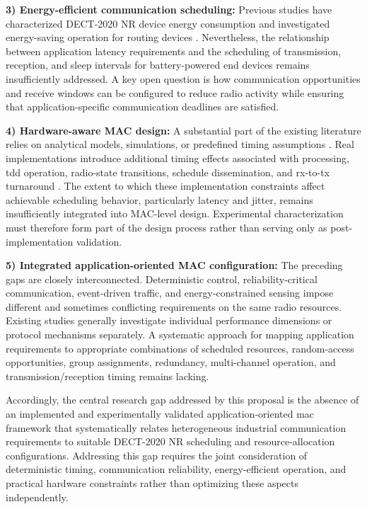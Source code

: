 \documentclass[12pt,a4paper]{article}
\begin{document}
\textbf{3) Energy-efficient communication scheduling:}
Previous studies have characterized DECT-2020 NR device energy consumption and investigated energy-saving operation for routing devices
\cite{nihtilaEnergyConsumptionDECT20202022,
nihtilaEnergySavingRouter2022}.
Nevertheless, the relationship between application latency requirements and the scheduling of transmission, reception, and sleep intervals for battery-powered end devices remains insufficiently addressed. A key open question is how communication opportunities and receive windows can be configured to reduce radio activity while ensuring that application-specific communication deadlines are satisfied.

\textbf{4) Hardware-aware MAC design:}
A substantial part of the existing literature relies on analytical models, simulations, or predefined timing assumptions
\cite{dhanwaniAssessmentCandidateTechnology2020,
anttonenEnablingMassiveMachine2021a,
pennerURLLCPerformanceEvaluation2021}.
Real implementations introduce additional timing effects associated with processing, \gls{tdd} operation, radio-state transitions, schedule dissemination, and \gls{rx}-to-\gls{tx} turnaround
\cite{wassmannPerformanceDECT2020NR2024,
haqueDECT2020NRLink2025,
grafWhatExpectWhen2026}.
The extent to which these implementation constraints affect achievable scheduling behavior, particularly latency and jitter, remains insufficiently integrated into MAC-level design. Experimental characterization must therefore form part of the design process rather than serving only as post-implementation validation.

\textbf{5) Integrated application-oriented MAC configuration:}
The preceding gaps are closely interconnected. Deterministic control, reliability-critical communication, event-driven traffic, and energy-constrained sensing impose different and sometimes conflicting requirements on the same radio resources. Existing studies generally investigate individual performance dimensions or protocol mechanisms separately. A systematic approach for mapping application requirements to appropriate combinations of scheduled resources, random-access opportunities, group assignments, redundancy, multi-channel operation, and transmission/reception timing remains lacking.

Accordingly, the central research gap addressed by this proposal is the absence of an implemented and experimentally validated application-oriented \gls{mac} framework that systematically relates heterogeneous industrial communication requirements to suitable DECT-2020 NR scheduling and resource-allocation configurations. Addressing this gap requires the joint consideration of deterministic timing, communication reliability, energy-efficient operation, and practical hardware constraints rather than optimizing these aspects independently.
\end{document}
